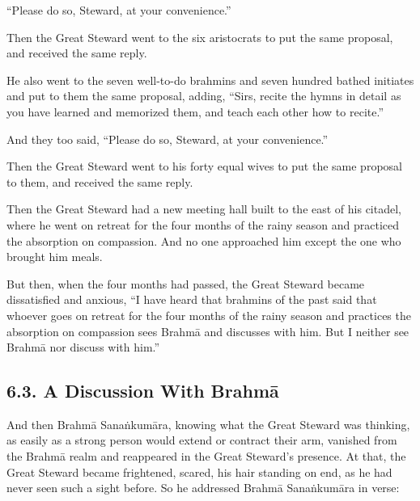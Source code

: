 \documentclass[12pt,openany]{book}%
\begin{document}
“Please do so, Steward, at your convenience.” 

Then the Great Steward went to the six aristocrats to put the same proposal, and received the same reply. 

He also went to the seven well-to-do brahmins and seven hundred bathed initiates and put to them the same proposal, adding, “Sirs, recite the hymns in detail as you have learned and memorized them, and teach each other how to recite.” 

And they too said, “Please do so, Steward, at your convenience.” 

Then the Great Steward went to his forty equal wives to put the same proposal to them, and received the same reply. 

Then the Great Steward had a new meeting hall built to the east of his citadel, where he went on retreat for the four months of the rainy season and practiced the absorption on compassion. And no one approached him except the one who brought him meals. 

But then, when the four months had passed, the Great Steward became dissatisfied and anxious, “I have heard that brahmins of the past said that whoever goes on retreat for the four months of the rainy season and practices the absorption on compassion sees \textsanskrit{Brahmā} and discusses with him. But I neither see \textsanskrit{Brahmā} nor discuss with him.” 

\subsection*{6.3. A Discussion With \textsanskrit{Brahmā} }

And then \textsanskrit{Brahmā} \textsanskrit{Sanaṅkumāra}, knowing what the Great Steward was thinking, as easily as a strong person would extend or contract their arm, vanished from the \textsanskrit{Brahmā} realm and reappeared in the Great Steward’s presence. At that, the Great Steward became frightened, scared, his hair standing on end, as he had never seen such a sight before. So he addressed \textsanskrit{Brahmā} \textsanskrit{Sanaṅkumāra} in verse: 
\end{document}
